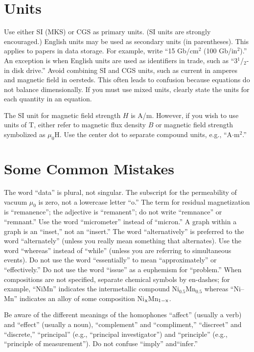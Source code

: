 \documentclass[journal]{IEEEtai}
\begin{document}
\section{Units}

Use either SI (MKS) or CGS as primary units. (SI units are strongly encouraged.) English units may be used as secondary units (in parentheses). This applies to papers in data storage. For example, write ``15 Gb/cm$^2$ (100 Gb/in$^2$).'' An exception is when English units are used as identifiers in trade, such as ``3$^1${/}$_2$-in disk drive.'' Avoid combining SI and CGS units, such as current in amperes and magnetic field in oersteds. This often leads to confusion because equations do not balance dimensionally. If you must use mixed units, clearly state the units for each quantity in an equation.

The SI unit for magnetic field strength $H$ is A/m. However, if you wish to use units of T, either refer to magnetic flux density $B$ or magnetic field strength symbolized as $\mu_0$H. Use the center dot to separate compound units, e.g., ``A$\cdot$m$^2$.''

\section{Some Common Mistakes}

The word ``data'' is plural, not singular. The subscript for the permeability of vacuum $\mu_0$ is zero, not a lowercase letter ``o.'' The term for residual magnetization is ``remanence''; the adjective is ``remanent''; do not write ``remnance'' or ``remnant.'' Use the word ``micrometer'' instead of ``micron.'' A graph within a graph is an ``inset,'' not an ``insert.'' The word ``alternatively'' is preferred to the word ``alternately'' (unless you really mean something that alternates). Use the word ``whereas'' instead of ``while'' (unless you are referring to simultaneous events). Do not use the word ``essentially'' to mean ``approximately'' or ``effectively.'' Do not use the word ``issue'' as a euphemism for ``problem.'' When compositions are not specified, separate chemical symbols by en-dashes; for example, ``NiMn'' indicates the intermetallic compound Ni$_{0.5}$Mn$_{0.5}$ whereas ``Ni--Mn'' indicates an alloy of some composition Ni$_{\rm x}$Mn$_{1-{\rm x}}$.

Be aware of the different meanings of the homophones ``affect'' (usually a verb) and ``effect'' (usually a noun), ``complement'' and ``compliment,'' ``discreet'' and ``discrete,'' ``principal'' (e.g., ``principal investigator'') and ``principle'' (e.g., ``principle of measurement''). Do not confuse ``imply'' and\break ``infer.'' 
\end{document}
